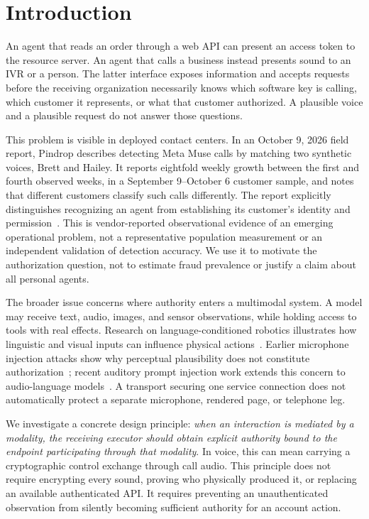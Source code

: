 \section{Introduction}
An agent that reads an order through a web API can present an access token to the
resource server. An agent that calls a business instead presents sound to an IVR
or a person. The latter interface exposes information and accepts requests before
the receiving organization necessarily knows which software key is calling,
which customer it represents, or what that customer authorized. A plausible
voice and a plausible request do not answer those questions.

This problem is visible in deployed contact centers. In an October 9, 2026 field
report, Pindrop describes detecting Meta Muse calls by matching two synthetic
voices, Brett and Hailey. It reports eightfold weekly growth between the first
and fourth observed weeks, in a September 9--October 6 customer sample, and notes
that different customers classify such calls differently. The report explicitly
distinguishes recognizing an agent from establishing its customer's identity and
permission~\cite{pindrop2026}. This is vendor-reported observational evidence of
an emerging operational problem, not a representative population measurement or
an independent validation of detection accuracy. We use it to motivate the
authorization question, not to estimate fraud prevalence or justify a claim
about all personal agents.

The broader issue concerns where authority enters a multimodal system. A model
may receive text, audio, images, and sensor observations, while holding access to
tools with real effects. Research on language-conditioned robotics illustrates
how linguistic and visual inputs can influence physical actions~\cite{saycan,rt2}.
Earlier microphone injection attacks show why perceptual plausibility does not
constitute authorization~\cite{dolphin,lightcommands}; recent auditory prompt
injection work extends this concern to audio-language models~\cite{audiohijack}.
A transport securing one service connection does not automatically protect a
separate microphone, rendered page, or telephone leg.

We investigate a concrete design principle: \emph{when an interaction is mediated
by a modality, the receiving executor should obtain explicit authority bound to
the endpoint participating through that modality}. In voice, this can mean
carrying a cryptographic control exchange through call audio. This principle
does not require encrypting every sound, proving who physically produced it,
or replacing an available authenticated API. It requires preventing an
unauthenticated observation from silently becoming sufficient authority for an
account action.

